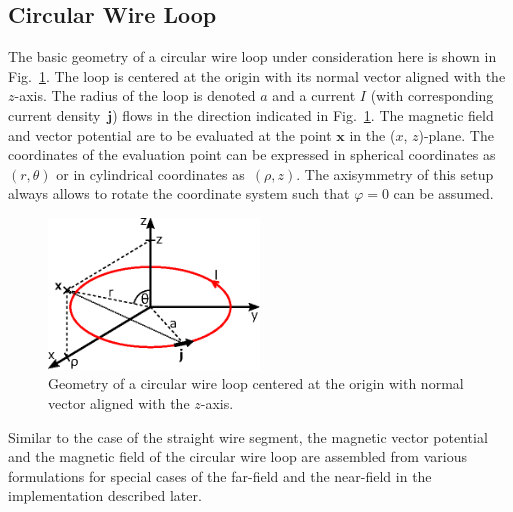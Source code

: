 \FloatBarrier
\subsection{Circular Wire Loop}
\label{sec:methods_cwl}
The basic geometry of a circular wire loop under consideration here is shown in Fig.~\ref{fig:circularWireLoop}.
The loop is centered at the origin with its normal vector aligned with the $z$-axis.
The radius of the loop is denoted $a$ and a current $I$ (with corresponding current density~$\mathbf{j}$)
flows in the direction indicated in Fig.~\ref{fig:circularWireLoop}.
The magnetic field and vector potential are to be evaluated at the point $\mathbf{x}$ in the ($x$, $z$)-plane.
The coordinates of the evaluation point can be expressed in spherical coordinates as~$(r, \theta)$
or in cylindrical coordinates as~$(\rho, z)$.
The axisymmetry of this setup always allows to rotate the coordinate system such that $\varphi=0$ can be assumed.
\begin{figure}[htbp]
 \centering
 \includegraphics[width=0.5\textwidth]{img/circularWireLoop.eps}
 \caption{Geometry of a circular wire loop centered at the origin with normal vector aligned with the $z$-axis.}
 \label{fig:circularWireLoop}
\end{figure}
Similar to the case of the straight wire segment,
the magnetic vector potential and the magnetic field of the circular wire loop
are assembled from various formulations for special cases of the far-field and the near-field
in the implementation described later.

